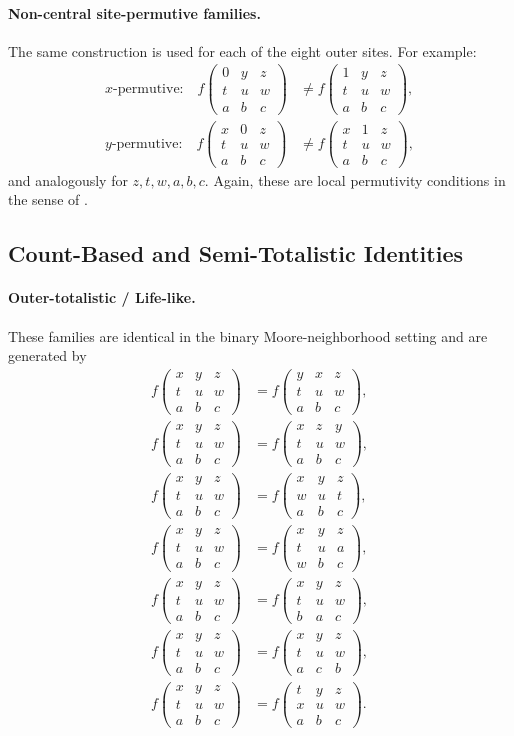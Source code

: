 \documentclass[11pt,a4paper]{article}
\newcommand{\nbhd}[9]{%
  \begin{smallmatrix}
  #1 & #2 & #3 \\
  #4 & #5 & #6 \\
  #7 & #8 & #9
  \end{smallmatrix}
}
\newcommand{\F}[1]{f\!\left(#1\right)}
\begin{document}
\paragraph{Non-central site-permutive families.}
The same construction is used for each of the eight outer sites.  For example:
\begin{align*}
\text{\(x\)-permutive:}\quad
\F{\nbhd{0}{y}{z}{t}{u}{w}{a}{b}{c}}
&\neq
\F{\nbhd{1}{y}{z}{t}{u}{w}{a}{b}{c}},\\
\text{\(y\)-permutive:}\quad
\F{\nbhd{x}{0}{z}{t}{u}{w}{a}{b}{c}}
&\neq
\F{\nbhd{x}{1}{z}{t}{u}{w}{a}{b}{c}},
\end{align*}
and analogously for \(z,t,w,a,b,c\).  Again, these are local permutivity conditions in the
sense of \cite{AlloucheSkordev2003}.

\subsection{Count-Based and Semi-Totalistic Identities}

\paragraph{Outer-totalistic / Life-like.}
These families are identical in the binary Moore-neighborhood setting and are generated by
\begin{align*}
\F{\nbhd{x}{y}{z}{t}{u}{w}{a}{b}{c}} &= \F{\nbhd{y}{x}{z}{t}{u}{w}{a}{b}{c}},\\
\F{\nbhd{x}{y}{z}{t}{u}{w}{a}{b}{c}} &= \F{\nbhd{x}{z}{y}{t}{u}{w}{a}{b}{c}},\\
\F{\nbhd{x}{y}{z}{t}{u}{w}{a}{b}{c}} &= \F{\nbhd{x}{y}{z}{w}{u}{t}{a}{b}{c}},\\
\F{\nbhd{x}{y}{z}{t}{u}{w}{a}{b}{c}} &= \F{\nbhd{x}{y}{z}{t}{u}{a}{w}{b}{c}},\\
\F{\nbhd{x}{y}{z}{t}{u}{w}{a}{b}{c}} &= \F{\nbhd{x}{y}{z}{t}{u}{w}{b}{a}{c}},\\
\F{\nbhd{x}{y}{z}{t}{u}{w}{a}{b}{c}} &= \F{\nbhd{x}{y}{z}{t}{u}{w}{a}{c}{b}},\\
\F{\nbhd{x}{y}{z}{t}{u}{w}{a}{b}{c}} &= \F{\nbhd{t}{y}{z}{x}{u}{w}{a}{b}{c}}.
\end{align*}
\end{document}
